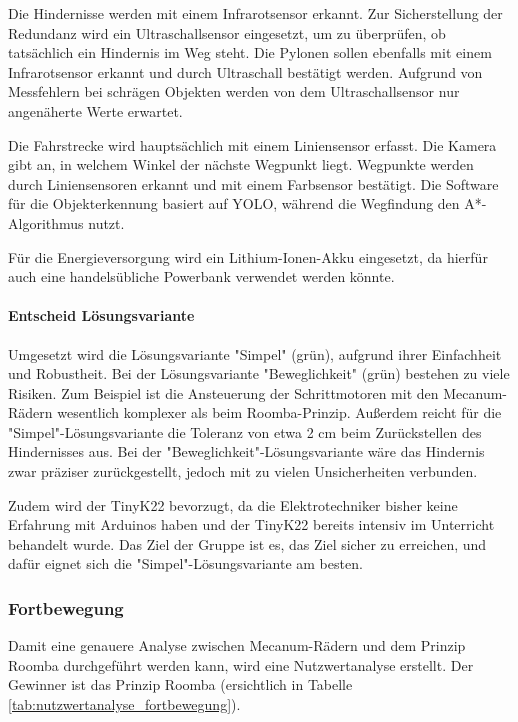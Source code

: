 \documentclass[../main.tex]{subfiles}
\begin{document}
    Die Hindernisse werden mit einem Infrarotsensor erkannt. Zur Sicherstellung der Redundanz wird ein Ultraschallsensor eingesetzt, um zu überprüfen, ob tatsächlich ein Hindernis im Weg steht. Die Pylonen sollen ebenfalls mit einem Infrarotsensor erkannt und durch Ultraschall bestätigt werden. Aufgrund von Messfehlern bei schrägen Objekten werden von dem Ultraschallsensor nur angenäherte Werte erwartet.

    Die Fahrstrecke wird hauptsächlich mit einem Liniensensor erfasst. Die Kamera gibt an, in welchem Winkel der nächste Wegpunkt liegt. Wegpunkte werden durch Liniensensoren erkannt und mit einem Farbsensor bestätigt. Die Software für die Objekterkennung basiert auf YOLO, während die Wegfindung den A*-Algorithmus nutzt.

    Für die Energieversorgung wird ein Lithium-Ionen-Akku eingesetzt, da hierfür auch eine handelsübliche Powerbank verwendet werden könnte.

    \paragraph{Entscheid Lösungsvariante}
    \label{a3:EntscheidLösungsvariante}
    Umgesetzt wird die Lösungsvariante "Simpel" (grün), aufgrund ihrer Einfachheit und Robustheit. Bei der Lösungsvariante "Beweglichkeit" (grün) bestehen zu viele Risiken. Zum Beispiel ist die Ansteuerung der Schrittmotoren mit den Mecanum-Rädern wesentlich komplexer als beim Roomba-Prinzip. Außerdem reicht für die "Simpel"-Lösungsvariante die Toleranz von etwa 2 cm beim Zurückstellen des Hindernisses aus. Bei der "Beweglichkeit"-Lösungsvariante wäre das Hindernis zwar präziser zurückgestellt, jedoch mit zu vielen Unsicherheiten verbunden.

    Zudem wird der TinyK22 bevorzugt, da die Elektrotechniker bisher keine Erfahrung mit Arduinos haben und der TinyK22 bereits intensiv im Unterricht behandelt wurde. Das Ziel der Gruppe ist es, das Ziel sicher zu erreichen, und dafür eignet sich die "Simpel"-Lösungsvariante am besten.
    
    \subsubsection{Fortbewegung}

    Damit eine genauere Analyse zwischen Mecanum-Rädern und dem Prinzip Roomba durchgeführt werden kann, wird eine Nutzwertanalyse erstellt. Der Gewinner ist das Prinzip Roomba (ersichtlich in Tabelle \ref{tab:nutzwertanalyse_fortbewegung}).
\end{document}
